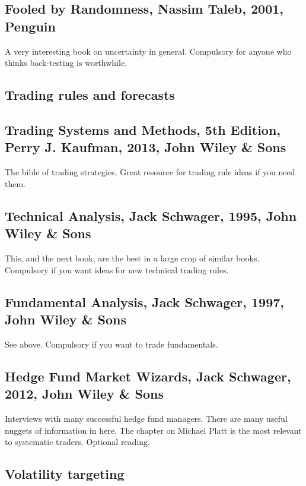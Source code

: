 \subsection*{Fooled by Randomness, Nassim Taleb, 2001, Penguin}

A very interesting book on uncertainty in general. Compulsory for anyone who thinks back-testing is worthwhile.

\subsection*{Trading rules and forecasts}

\subsection*{Trading Systems and Methods, 5th Edition, Perry J. Kaufman, 2013, John Wiley \& Sons}

The bible of trading strategies. Great resource for trading rule ideas if you need them.

\subsection*{Technical Analysis, Jack Schwager, 1995, John Wiley \& Sons}

This, and the next book, are the best in a large crop of similar books. Compulsory if you want ideas for new technical trading rules.

\subsection*{Fundamental Analysis, Jack Schwager, 1997, John Wiley \& Sons}

See above. Compulsory if you want to trade fundamentals.

\subsection*{Hedge Fund Market Wizards, Jack Schwager, 2012, John Wiley \& Sons}

Interviews with many successful hedge fund managers. There are many useful nuggets of information in here. The chapter on Michael Platt is the most relevant to systematic traders. Optional reading.

\subsection*{Volatility targeting}

